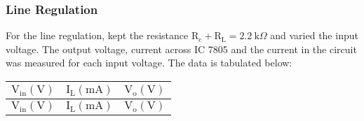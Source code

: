 \documentclass{scrartcl}
\begin{document}
\subsubsection{Line Regulation}
For the line regulation, kept the resistance $\mathrm{R_c+R_L}=2.2 \ \mathrm{k}\Omega$ and varied the input voltage. The output voltage, current across IC 7805 and the current in the circuit was measured for each input voltage. The data is tabulated below:
\begin{longtable}{|c|c|c|}
        \hline
       {$\mathrm{V_{in} (V)}$} & $\mathrm{I_L (mA)}$ & $\mathrm{V_o (V)}$ \\ \hline
        \endfirsthead
        
        \hline
        {$\mathrm{V_{in} (V)}$} & $\mathrm{I_L (mA)}$ & $\mathrm{V_o (V)}$ 
        \endhead
        
        \hline
        \endfoot
        
        \hline
        \endlastfoot
        

\end{longtable}
\end{document}
